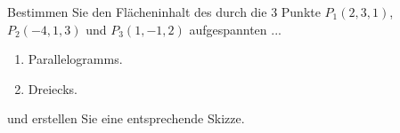 \begin{ExerciseBlock}
Bestimmen Sie den Flächeninhalt des durch die 3 Punkte $P_1(2,3,1)$, $P_2(-4,1,3)$ und $P_3(1,-1,2)$ aufgespannten ...
 \begin{enumerate}[label=\alph*)]
	\item Parallelogramms.
	\item Dreiecks.
\end{enumerate}
und erstellen Sie eine entsprechende Skizze. 

\end{ExerciseBlock}
